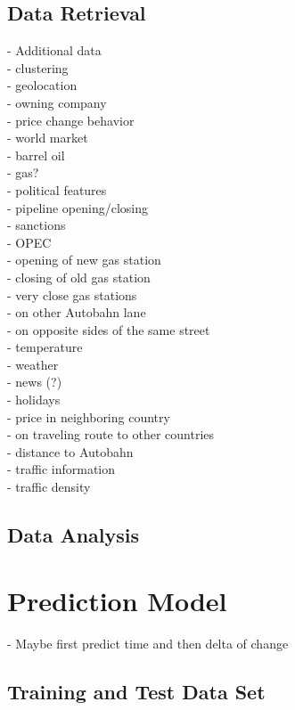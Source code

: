 \documentclass[%
a4paper,
DIV12,
2.5headlines,
bigheadings,
titlepage,
openbib,
]{scrartcl}
\begin{document}
\subsection{Data Retrieval}\label{data-retrieval}
- Additional data\\
 - clustering\\
  - geolocation\\
  - owning company\\
  - price change behavior\\
 - world market\\
  - barrel oil\\
  - gas?\\
 - political features\\
  - pipeline opening/closing\\
  - sanctions\\
  - OPEC\\
 - opening of new gas station\\
 - closing of old gas station\\
 - very close gas stations\\
  - on other Autobahn lane\\
  - on opposite sides of the same street\\
 - temperature\\
 - weather\\
 - news (?)\\
 - holidays\\
 - price in neighboring country\\
 - on traveling route to other countries\\
 - distance to Autobahn\\
 - traffic information\\
 - traffic density\\
 
 


\subsection{Data Analysis}\label{data-analysis}



\section{Prediction Model}\label{prediction-model}
- Maybe first predict time and then delta of change


\subsection{Training and Test Data
Set}\label{training-and-test-data-set}
\end{document}
